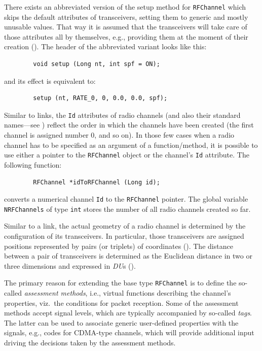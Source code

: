 There exists an abbreviated version of the setup method for
{\tt RFChannel} which skips the default attributes of transceivers,
setting them to generic and mostly unusable values.
That way it is assumed that the transceivers will take care of those
attributes all by themselves, e.g., providing them at the moment of their
creation ().
The header of the abbreviated variant looks like this:
\begin{verbatim}
        void setup (Long nt, int spf = ON);
\end{verbatim}
\noindent
and its effect is equivalent to:
\begin{verbatim}
        setup (nt, RATE_0, 0, 0.0, 0.0, spf);
\end{verbatim}
\noindent

Similar to links,
the {\tt Id} attributes of radio channels (and also their standard names---see
) reflect the order in which the channels have been created
(the first channel is assigned number 0, and so on).
In those few cases when a radio channel has to be specified as an argument of
a function/method, it is possible to use either
a pointer to the {\tt RFChannel} object or the channel's {\tt Id} attribute.
The following function:
\begin{verbatim}
        RFChannel *idToRFChannel (Long id);
\end{verbatim}
converts a numerical channel {\tt Id} to the {\tt RFChannel} pointer.
The global variable {\tt NRFChannels} of type {\tt int} stores the number of
all radio channels created so far.

\medskip

Similar to a link, the actual geometry of a radio channel is determined by
the configuration of its transceivers.
In particular, those transceivers are assigned positions represented by
pairs (or triplets) of coordinates ().
The distance between a pair of transceivers
is determined as the Euclidean distance
in two or three dimensions and expressed in {\em DU\/}s ().

The primary reason for extending the base type {\tt RFChannel} is to define
the so-called {\em assessment methods}, i.e.,
virtual functions describing the channel's properties, viz.\ the
conditions for packet reception.
Some of the assessment
methods accept signal levels, which are typically accompanied by
so-called {\em tags}.
The latter can be used to associate generic user-defined
properties with the signals, e.g., codes for CDMA-type channels, which will
provide additional input driving the decisions taken by the assessment
methods.

